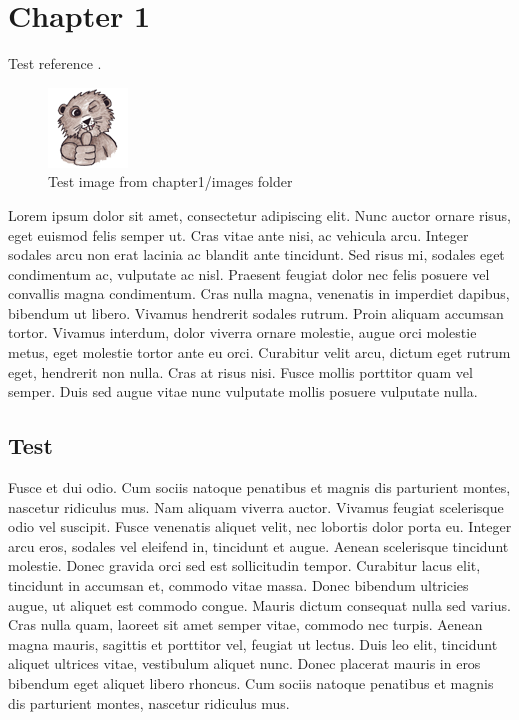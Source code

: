 \chapter{Chapter 1}

Test reference \cite{thesistpl}.

\begin{figure}[H]
	\begin{center}
		\includegraphics{content/chapter1/images/beaver}
		\caption{Test image from chapter1/images folder}
	\end{center}
\end{figure}

Lorem ipsum dolor sit amet, consectetur adipiscing elit. Nunc auctor ornare risus, eget euismod felis semper ut. Cras vitae ante nisi, ac vehicula arcu. Integer sodales arcu non erat lacinia ac blandit ante tincidunt. Sed risus mi, sodales eget condimentum ac, vulputate ac nisl. Praesent feugiat dolor nec felis posuere vel convallis magna condimentum. Cras nulla magna, venenatis in imperdiet dapibus, bibendum ut libero. Vivamus hendrerit sodales rutrum. Proin aliquam accumsan tortor. Vivamus interdum, dolor viverra ornare molestie, augue orci molestie metus, eget molestie tortor ante eu orci. Curabitur velit arcu, dictum eget rutrum eget, hendrerit non nulla. Cras at risus nisi. Fusce mollis porttitor quam vel semper. Duis sed augue vitae nunc vulputate mollis posuere vulputate nulla.

\section{Test}

Fusce et dui odio. Cum sociis natoque penatibus et magnis dis parturient montes, nascetur ridiculus mus. Nam aliquam viverra auctor. Vivamus feugiat scelerisque odio vel suscipit. Fusce venenatis aliquet velit, nec lobortis dolor porta eu. Integer arcu eros, sodales vel eleifend in, tincidunt et augue. Aenean scelerisque tincidunt molestie. Donec gravida orci sed est sollicitudin tempor. Curabitur lacus elit, tincidunt in accumsan et, commodo vitae massa. Donec bibendum ultricies augue, ut aliquet est commodo congue. Mauris dictum consequat nulla sed varius. Cras nulla quam, laoreet sit amet semper vitae, commodo nec turpis. Aenean magna mauris, sagittis et porttitor vel, feugiat ut lectus. Duis leo elit, tincidunt aliquet ultrices vitae, vestibulum aliquet nunc. Donec placerat mauris in eros bibendum eget aliquet libero rhoncus. Cum sociis natoque penatibus et magnis dis parturient montes, nascetur ridiculus mus.

